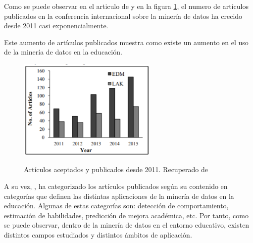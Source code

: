 Como se puede observar en el articulo de  y en la figura \ref{fig:artPublicados}, el numero de artículos publicados en la conferencia internacional sobre la minería de datos ha crecido desde 2011 casi exponencialmente.

Este aumento de artículos publicados muestra como existe un aumento en el uso de la minería de datos en la educación.

\begin{figure}[htb]
	\centering
	\caption{Artículos aceptados y publicados desde 2011. Recuperado de \protect{}}
	\includegraphics[width=0.6\textwidth]{recursos/artPublicados}
	\label{fig:artPublicados}
\end{figure}
\FloatBarrier

A su vez, , ha categorizado los artículos publicados según su contenido en categorías que definen las distintas aplicaciones de la minería de datos en la educación. Algunas de estas categorías son: detección de comportamiento, estimación de habilidades, predicción de mejora académica, etc. Por tanto, como se puede observar, dentro de la minería de datos en el entorno educativo, existen distintos campos estudiados y distintos ámbitos de aplicación.


